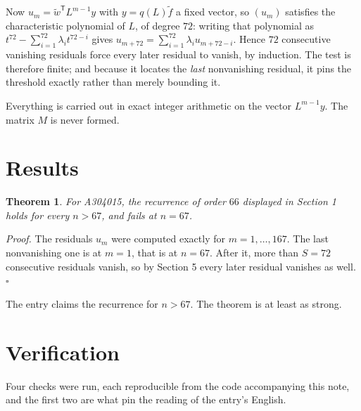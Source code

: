 \documentclass[11pt]{article}
\newtheorem{theorem}{Theorem}
\theoremstyle{definition}
\begin{document}
Now $u_m = \tilde w^{\mathsf T} L^{m-1} y$ with $y = q(L)\tilde f$ a fixed vector, so $(u_m)$ satisfies the characteristic polynomial of $L$, of degree $72$: writing that polynomial as $t^{72} - \sum_{i=1}^{72} \lambda_i t^{72-i}$ gives $u_{m+72} = \sum_{i=1}^{72} \lambda_i u_{m+72-i}$. Hence $72$ consecutive vanishing residuals force every later residual to vanish, by induction. The test is therefore finite; and because it locates the {\itshape last} nonvanishing residual, it pins the threshold exactly rather than merely bounding it.

Everything is carried out in exact integer arithmetic on the vector $L^{m-1}y$. The matrix $M$ is never formed.

\section{Results}

\begin{theorem} For A304015, the recurrence of order $66$ displayed in Section 1 holds for every $n > 67$, and fails at $n = 67$.\end{theorem}

{\itshape Proof.} The residuals $u_m$ were computed exactly for $m = 1,\dots,167$. The last nonvanishing one is at $m = 1$, that is at $n = 67$. After it, more than $S = 72$ consecutive residuals vanish, so by Section 5 every later residual vanishes as well. $\square$

The entry claims the recurrence for $n > 67$. The theorem is at least as strong.

\section{Verification}

Four checks were run, each reproducible from the code accompanying this note, and the first two are what pin the reading of the entry's English.
\end{document}
